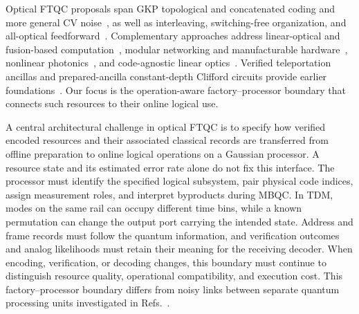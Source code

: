 \documentclass[aps,
prx,
superscriptaddress,
reprint,
longbibliography,
floatfix]{revtex4-2}
\begin{document}
Optical FTQC proposals span GKP topological and concatenated coding and more general CV noise~\cite{Fukui2018Analog,Fukui2020Temporal3D,Yamasaki2020Polylog,Larsen2021FTCVMBQC,Bourassa2021Blueprint,Tzitrin2021Static,Noh2022LowOverhead,Matsuura2026GeneralNoise}, as well as interleaving, switching-free organization, and all-optical feedforward~\cite{Bombin2021Interleaving,Asavanant2023SwitchingFree,Renault2025Switchless,Hoshi2026AllOpticalTeleportation}. Complementary approaches address linear-optical and fusion-based computation~\cite{Kok2007LOQCReview,Rudolph2017WhyPhotonic,Ewert2014BoostedFusion,Bartolucci2023Fusion}, modular networking and manufacturable hardware~\cite{AghaeeRad2025ModularPhotonic,PsiQuantum2025Manufacturable}, nonlinear photonics~\cite{Yu2026PhotonicNonlinearity}, and code-agnostic linear optics~\cite{Walshe2025ArbitraryCodes}. Verified teleportation ancillas and prepared-ancilla constant-depth Clifford circuits provide earlier foundations~\cite{Knill2005,AGP2008Postselection,Zheng2020ConstantDepth}. Our focus is the operation-aware factory--processor boundary that connects such resources to their online logical use.

A central architectural challenge in optical FTQC is to specify how verified encoded resources and their associated classical records are transferred from offline preparation to online logical operations on a Gaussian processor.
A resource state and its estimated error rate alone do not fix this interface. The processor must identify the specified logical subsystem, pair physical code indices, assign measurement roles, and interpret byproducts during MBQC. 
In TDM, modes on the same rail can occupy different time bins, while a known permutation can change the output port carrying the intended state. Address and frame records must follow the quantum information, and verification outcomes and analog likelihoods must retain their meaning for the receiving decoder. When encoding, verification, or decoding changes, this boundary must continue to distinguish resource quality, operational compatibility, and execution cost. 
This factory--processor boundary differs from noisy links between separate quantum processing units investigated in Refs.~\cite{Marqversen2025FTInterfaces,Chelluri2026NoisyInterfaces}.
\end{document}
